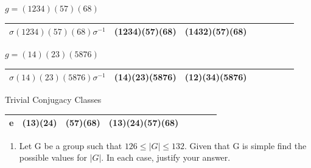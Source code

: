 \documentclass[11pt,a4paper]{article}
\begin{document}
\begin{enumerate}[1.]
\begin{flushleft}
			$g = (1234)(57)(68)$
			\begin{table}[H]
				\begin{tabular}{|r|r|r|r|r|r|r|r|}
					\hline
					$\sigma(1234)(57)(68)\sigma^{-1}$ & (1234)(57)(68) & (1432)(57)(68) \\
					\hline
				\end{tabular}
			\end{table}
			
			$g = (14)(23)(5876)$
			\begin{table}[H]
				\begin{tabular}{|r|r|r|r|r|r|r|r|}
					\hline
					$\sigma(14)(23)(5876)\sigma^{-1}$ & (14)(23)(5876) & (12)(34)(5876) \\
					\hline
				\end{tabular}
			\end{table}
			
			Trivial Conjugacy Classes
			\begin{table}[H]
				\begin{tabular}{|r|r|r|r|r|r|r|r|}
					\hline
					e & (13)(24) & (57)(68) & (13)(24)(57)(68) \\
					\hline
				\end{tabular}
			\end{table}   
		\end{flushleft}
	\end{enumerate}
	
	\begin{enumerate}[3.]
		\item Let G be a group such that $126 \le |G| \le 132$. Given that G is simple find the possible values for $|G|$. In each case, justify your answer.
	\end{enumerate}
	
\end{document}
